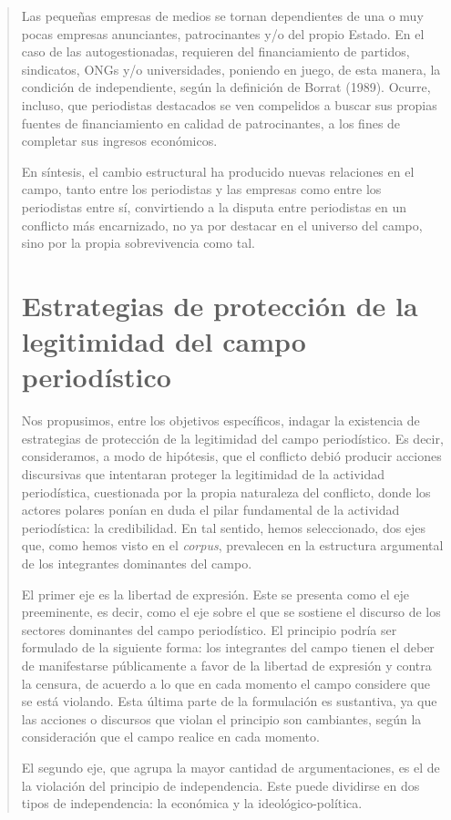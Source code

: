\begin{quote}
Las pequeñas empresas de medios se tornan dependientes de una o muy pocas empresas anunciantes, patrocinantes y/o del propio Estado. En el caso de las autogestionadas, requieren del financiamiento de partidos, sindicatos, ONGs y/o universidades, poniendo en juego, de esta manera, la condición de independiente, según la definición de Borrat (1989). Ocurre, incluso, que periodistas destacados se ven compelidos a buscar sus propias fuentes de financiamiento en calidad de patrocinantes, a los fines de completar sus ingresos económicos.

En síntesis, el cambio estructural ha producido nuevas relaciones en el campo, tanto entre los periodistas y las empresas como entre los periodistas entre sí, convirtiendo a la disputa entre periodistas en un conflicto más encarnizado, no ya por destacar en el universo del campo, sino por la propia sobrevivencia como tal.

\section {Estrategias de protección de la legitimidad del campo periodístico}

Nos propusimos, entre los objetivos específicos, indagar la existencia de estrategias de protección de la legitimidad del campo periodístico. Es decir, consideramos, a modo de hipótesis, que el conflicto debió producir acciones discursivas que intentaran proteger la legitimidad de la actividad periodística, cuestionada por la propia naturaleza del conflicto, donde los actores polares ponían en duda el pilar fundamental de la actividad periodística: la credibilidad. En tal sentido, hemos seleccionado, dos ejes que, como hemos visto en el \emph{corpus}, prevalecen en la estructura argumental de los integrantes dominantes del campo.

El primer eje es la libertad de expresión. Este se presenta como el eje preeminente, es decir, como el eje sobre el que se sostiene el discurso de los sectores dominantes del campo periodístico. El principio podría ser formulado de la siguiente forma: los integrantes del campo tienen el deber de manifestarse públicamente a favor de la libertad de expresión y contra la censura, de acuerdo a lo que en cada momento el campo considere que se está violando. Esta última parte de la formulación es sustantiva, ya que las acciones o discursos que violan el principio son cambiantes, según la consideración que el campo realice en cada momento.

El segundo eje, que agrupa la mayor cantidad de argumentaciones, es el de la violación del principio de independencia. Este puede dividirse en dos tipos de independencia: la económica y la ideológico-política.


\end{quote}
